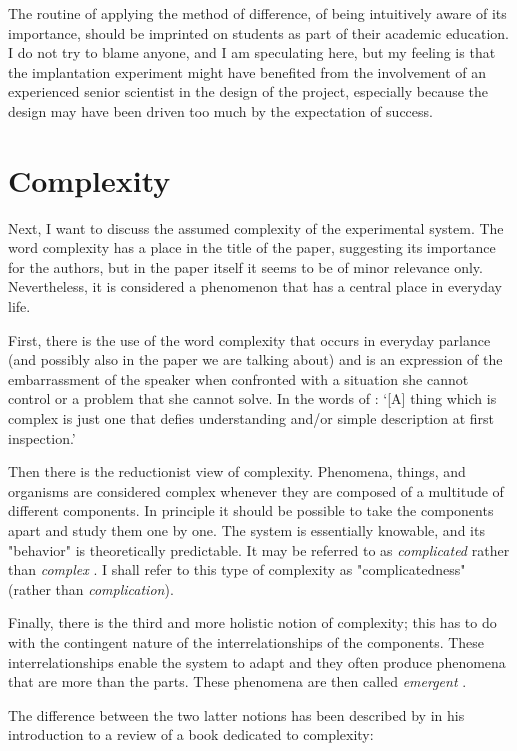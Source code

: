 \documentclass[twocolumn, reflection, authordate,  issue]{jote-new-article}
\begin{document}
The routine of applying the method of difference, of being intuitively aware of its importance, should be imprinted on students as part of their academic education. I do not try to blame anyone, and I am speculating here, but my feeling is that the implantation experiment might have benefited from the involvement of an experienced senior scientist in the design of the project, especially because the design may have been driven too much by the expectation of success.

\section{Complexity} 

Next, I want to discuss the assumed complexity of the experimental system. The word complexity has a place in the title of the paper, suggesting its importance for the authors, but in the paper itself it seems to be of minor relevance only. Nevertheless, it is considered a phenomenon that has a central place in everyday life.

First, there is the use of the word complexity that occurs in everyday parlance (and possibly also in the paper we are talking about) and is an expression of the embarrassment of the speaker when confronted with a situation she cannot control or a problem that she cannot solve. In the words of \textcite[p. 748]{Chambers2015}: `{[}A{]} thing which is complex is just one that defies understanding and/or simple description at first inspection.'

Then there is the reductionist view of complexity. Phenomena, things, and organisms are considered complex whenever they are composed of a multitude of different components. In principle it should be possible to take the components apart and study them one by one. The system is essentially knowable, and its "behavior" is theoretically predictable. It may be referred to as \emph{complicated} rather than \emph{complex}
\parencite{Bawden2007}. I shall refer to this type of complexity as "complicatedness" (rather than \emph{complication}).

Finally, there is the third and more holistic notion of complexity; this has to do with the contingent nature of the interrelationships of the components. These interrelationships enable the system to adapt and they often produce phenomena that are more than the parts. These phenomena are then called \emph{emergent} \parencite{Page2011}.

The difference between the two latter notions has been described by \textcite{Radder2011} in his introduction to a review of a book dedicated to complexity:
\end{document}
